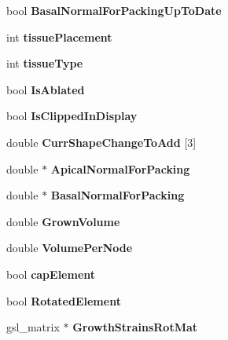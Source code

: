 \begin{DoxyCompactItemize}
\item 
\hypertarget{classShapeBase_a189180583fb224af63900411b2da53c6}{}bool {\bfseries Basal\+Normal\+For\+Packing\+Up\+To\+Date}\label{classShapeBase_a189180583fb224af63900411b2da53c6}

\item 
\hypertarget{classShapeBase_aff63b1fcb823bbfdb5b19fe78dea59b8}{}int {\bfseries tissue\+Placement}\label{classShapeBase_aff63b1fcb823bbfdb5b19fe78dea59b8}

\item 
\hypertarget{classShapeBase_a1d56f7eb3fed744adc268bc4da7a790f}{}int {\bfseries tissue\+Type}\label{classShapeBase_a1d56f7eb3fed744adc268bc4da7a790f}

\item 
\hypertarget{classShapeBase_a4f09d39d079bfe95ea7c25f5d3de6c09}{}bool {\bfseries Is\+Ablated}\label{classShapeBase_a4f09d39d079bfe95ea7c25f5d3de6c09}

\item 
\hypertarget{classShapeBase_a6f5e25bc9b4376c0aa28aec59af6cf2f}{}bool {\bfseries Is\+Clipped\+In\+Display}\label{classShapeBase_a6f5e25bc9b4376c0aa28aec59af6cf2f}

\item 
\hypertarget{classShapeBase_a3d48903871978d77a77cb77f569975c0}{}double {\bfseries Curr\+Shape\+Change\+To\+Add} \mbox{[}3\mbox{]}\label{classShapeBase_a3d48903871978d77a77cb77f569975c0}

\item 
\hypertarget{classShapeBase_ab84cbf988437cd20fcceee7a24d0c3a8}{}double $\ast$ {\bfseries Apical\+Normal\+For\+Packing}\label{classShapeBase_ab84cbf988437cd20fcceee7a24d0c3a8}

\item 
\hypertarget{classShapeBase_a87f03cc35ac66eeb14487c5f33097891}{}double $\ast$ {\bfseries Basal\+Normal\+For\+Packing}\label{classShapeBase_a87f03cc35ac66eeb14487c5f33097891}

\item 
\hypertarget{classShapeBase_a8a1bafcaf21f040dd137abfe434a75a9}{}double {\bfseries Grown\+Volume}\label{classShapeBase_a8a1bafcaf21f040dd137abfe434a75a9}

\item 
\hypertarget{classShapeBase_a59943ecb9f8ec139c0f564c1fb91d876}{}double {\bfseries Volume\+Per\+Node}\label{classShapeBase_a59943ecb9f8ec139c0f564c1fb91d876}

\item 
\hypertarget{classShapeBase_a21420915ac7c8444e0e5b5f4e98d7322}{}bool {\bfseries cap\+Element}\label{classShapeBase_a21420915ac7c8444e0e5b5f4e98d7322}

\item 
\hypertarget{classShapeBase_af64f900d51cec3e48a488fdd8a51eacf}{}bool {\bfseries Rotated\+Element}\label{classShapeBase_af64f900d51cec3e48a488fdd8a51eacf}

\item 
\hypertarget{classShapeBase_acc1408c3e89b91787fec7e913cac1f58}{}gsl\+\_\+matrix $\ast$ {\bfseries Growth\+Strains\+Rot\+Mat}\label{classShapeBase_acc1408c3e89b91787fec7e913cac1f58}

\end{DoxyCompactItemize}
